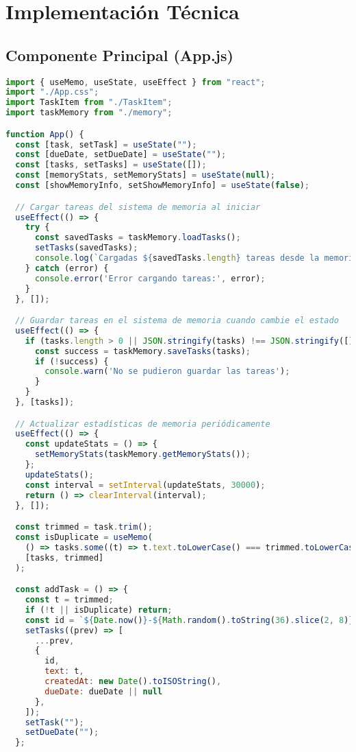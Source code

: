 \documentclass[12pt,a4paper]{article}
\begin{document}
\section{Implementación Técnica}

\subsection{Componente Principal (App.js)}
\begin{lstlisting}[language=JavaScript,caption={Estructura principal de la aplicación}]
import { useMemo, useState, useEffect } from "react";
import "./App.css";
import TaskItem from "./TaskItem";
import taskMemory from "./memory";

function App() {
  const [task, setTask] = useState("");
  const [dueDate, setDueDate] = useState("");
  const [tasks, setTasks] = useState([]);
  const [memoryStats, setMemoryStats] = useState(null);
  const [showMemoryInfo, setShowMemoryInfo] = useState(false);

  // Cargar tareas del sistema de memoria al iniciar
  useEffect(() => {
    try {
      const savedTasks = taskMemory.loadTasks();
      setTasks(savedTasks);
      console.log(`Cargadas ${savedTasks.length} tareas desde la memoria`);
    } catch (error) {
      console.error('Error cargando tareas:', error);
    }
  }, []);

  // Guardar tareas en el sistema de memoria cuando cambie el estado
  useEffect(() => {
    if (tasks.length > 0 || JSON.stringify(tasks) !== JSON.stringify([])) {
      const success = taskMemory.saveTasks(tasks);
      if (!success) {
        console.warn('No se pudieron guardar las tareas');
      }
    }
  }, [tasks]);

  // Actualizar estadísticas de memoria periódicamente
  useEffect(() => {
    const updateStats = () => {
      setMemoryStats(taskMemory.getMemoryStats());
    };
    updateStats();
    const interval = setInterval(updateStats, 30000);
    return () => clearInterval(interval);
  }, []);

  const trimmed = task.trim();
  const isDuplicate = useMemo(
    () => tasks.some((t) => t.text.toLowerCase() === trimmed.toLowerCase()),
    [tasks, trimmed]
  );

  const addTask = () => {
    const t = trimmed;
    if (!t || isDuplicate) return;
    const id = `${Date.now()}-${Math.random().toString(36).slice(2, 8)}`;
    setTasks((prev) => [
      ...prev,
      { 
        id, 
        text: t, 
        createdAt: new Date().toISOString(),
        dueDate: dueDate || null
      },
    ]);
    setTask("");
    setDueDate("");
  };


\end{lstlisting}
\end{document}
